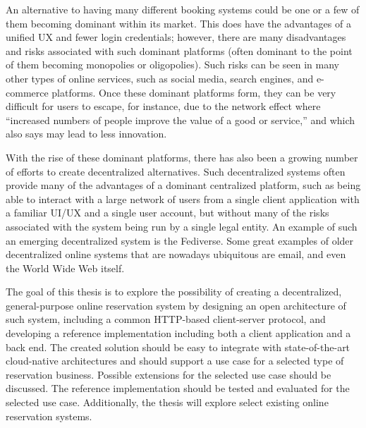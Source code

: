 An alternative to having many different booking systems could be one or a few of them becoming dominant within its market. This does have the advantages of a unified UX and fewer login credentials; however, there are many disadvantages and risks associated with such dominant platforms (often dominant to the point of them becoming monopolies or oligopolies). Such risks can be seen in many other types of online services, such as social media, search engines, and e-commerce platforms. Once these dominant platforms form, they can be very difficult for users to escape, for instance, due to the network effect where~\cite{investopedia_network_effect} \enquote{increased numbers of people improve the value of a good or service,} and which~\cite{investopedia_network_effect} also says may lead to less innovation.

With the rise of these dominant platforms, there has also been a growing number of efforts to create decentralized alternatives. Such decentralized systems often provide many of the advantages of a dominant centralized platform, such as being able to interact with a large network of users from a single client application with a familiar UI/UX and a single user account, but without many of the risks associated with the system being run by a single legal entity. An example of such an emerging decentralized system is the Fediverse. Some great examples of older decentralized online systems that are nowadays ubiquitous are email, and even the World Wide Web itself.

The goal of this thesis is to explore the possibility of creating a decentralized, general-purpose online reservation system by designing an open architecture of such system, including a common HTTP-based client-server protocol, and developing a reference implementation including both a client application and a back end. The created solution should be easy to integrate with state-of-the-art cloud-native architectures and should support a use case for a selected type of reservation business. Possible extensions for the selected use case should be discussed. The reference implementation should be tested and evaluated for the selected use case. Additionally, the thesis will explore select existing online reservation systems.
